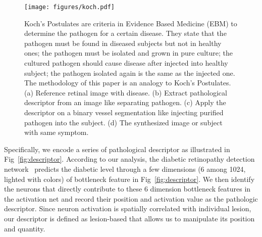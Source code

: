 \documentclass[letterpaper]{article} %
\begin{document}
	
	\begin{figure*}[h!]
		\begin{center}
			\texttt{[image: figures/koch.pdf]}
		\end{center}
		\caption{Koch's Postulates are criteria in Evidence Based Medicine (EBM) to determine the pathogen for a certain disease. They state that the pathogen must be found in diseased subjects but not in healthy ones; the pathogen must be isolated and grown in pure culture; the cultured pathogen should cause disease after injected into healthy subject; the pathogen isolated again is the same as the injected one. The methodology of this paper is an analogy to Koch's Postulates. (a) Reference retinal image with disease. (b) Extract pathological descriptor from an image like separating pathogen. (c) Apply the descriptor on a binary vessel segmentation like injecting purified pathogen into the subject. (d) The synthesized image or subject with same symptom.}
		\label{fig:koch}
	\end{figure*}
	
    
	
	Specifically, we  encode a series of pathological descriptor as illustrated in Fig~\ref{fig:descriptor}. According to our analysis, the diabetic retinopathy detection network~\cite{oO2016detector} predicts the diabetic level through a few dimensions (6 among 1024, lighted with colors) of bottleneck feature in Fig~\ref{fig:descriptor}. We then identify the neurons that directly contribute to these 6 dimension bottleneck features in the activation net and record their position and activation value as the pathologic descriptor. Since neuron activation is spatially correlated with individual lesion, our descriptor is defined as lesion-based that allows us to manipulate its position and quantity.
	
	
\end{document}
